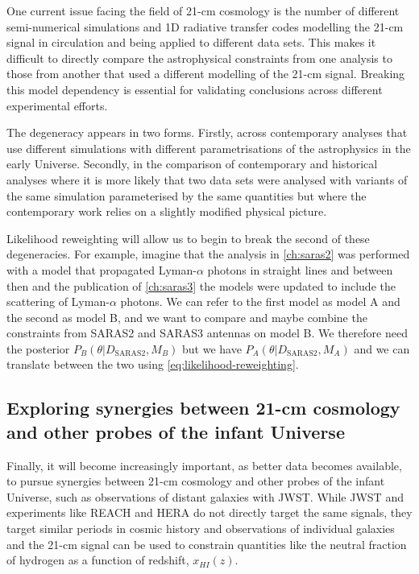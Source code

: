 One current issue facing the field of 21-cm cosmology is the number of different semi-numerical simulations and 1D radiative transfer codes modelling the 21-cm signal in circulation and being applied to different data sets. This makes it difficult to directly compare the astrophysical constraints from one analysis to those from another that used a different modelling of the 21-cm signal. Breaking this model dependency is essential for validating conclusions across different experimental efforts.

The degeneracy appears in two forms. Firstly, across contemporary analyses that use different simulations with different parametrisations of the astrophysics in the early Universe. Secondly, in the comparison of contemporary and historical analyses where it is more likely that two data sets were analysed with variants of the same simulation parameterised by the same quantities but where the contemporary work relies on a slightly modified physical picture. 

Likelihood reweighting will allow us to begin to break the second of these degeneracies. For example, imagine that the analysis in \cref{ch:saras2} was performed with a model that propagated Lyman-$\alpha$ photons in straight lines and between then and the publication of \cref{ch:saras3} the models were updated to include the scattering of Lyman-$\alpha$ photons. We can refer to the first model as model A and the second as model B, and we want to compare and maybe combine the constraints from SARAS2 and SARAS3 antennas on model B. We therefore need the posterior $P_B(\theta|D_\mathrm{SARAS2}, M_B)$ but we have $P_A(\theta|D_\mathrm{SARAS2}, M_A)$ and we can translate between the two using \cref{eq:likelihood-reweighting}. 

\subsection{Exploring synergies between 21-cm cosmology and other probes of the infant Universe}

Finally, it will become increasingly important, as better data becomes available, to pursue synergies between 21-cm cosmology and other probes of the infant Universe, such as observations of distant galaxies with JWST. While JWST and experiments like REACH and HERA do not directly target the same signals, they target similar periods in cosmic history and observations of individual galaxies and the 21-cm signal can be used to constrain quantities like the neutral fraction of hydrogen as a function of redshift, $x_{HI}(z)$. 

